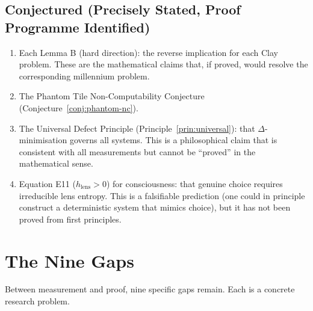 \documentclass[12pt, openany]{book}
\theoremstyle{remark}
\begin{document}
\subsection{Conjectured (Precisely Stated, Proof Programme Identified)}

\begin{enumerate}
  \item Each Lemma B (hard direction): the reverse implication for each Clay problem.
        These are the mathematical claims that, if proved, would resolve the
        corresponding millennium problem.
  \item The Phantom Tile Non-Computability Conjecture
        (Conjecture~\ref{conj:phantom-nc}).
  \item The Universal Defect Principle (Principle~\ref{prin:universal}): that
        $\Delta$-minimisation governs all systems. This is a philosophical claim
        that is consistent with all measurements but cannot be ``proved'' in the
        mathematical sense.
  \item Equation E11 ($h_{\mathrm{lens}} > 0$) for consciousness: that
        genuine choice requires irreducible lens entropy. This is a
        falsifiable prediction (one could in principle construct a
        deterministic system that mimics choice), but it has not been
        proved from first principles.
\end{enumerate}


\section{The Nine Gaps}
\label{sec:nine-gaps}

Between measurement and proof, nine specific gaps remain. Each is a concrete
research problem.
\end{document}
